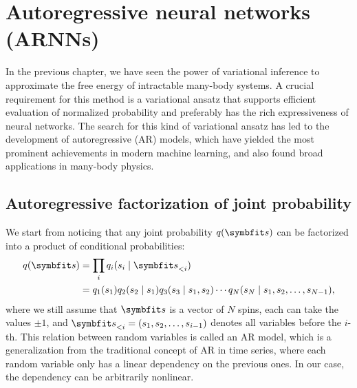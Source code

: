 \chapter{Autoregressive neural networks (ARNNs)}
\label{ch:arnn}

In the previous chapter, we have seen the power of variational inference to approximate the free energy of intractable many-body systems. A crucial requirement for this method is a variational ansatz that supports efficient evaluation of normalized probability and preferably has the rich expressiveness of neural networks. The search for this kind of variational ansatz has led to the development of autoregressive (AR) models, which have yielded the most prominent achievements in modern machine learning, and also found broad applications in many-body physics.

\section{Autoregressive factorization of joint probability}

We start from noticing that any joint probability $q(\vs)$ can be factorized into a product of conditional probabilities:
\begin{align}
q(\vs) &= \prod_i q_i(s_i \mid \vs_{< i}) \label{eq:autoreg} \\
&= q_1(s_1) q_2(s_2 \mid s_1) q_3(s_3 \mid s_1, s_2) \cdots q_N(s_N \mid s_1, s_2, \ldots, s_{N - 1}),
\end{align}
where we still assume that $\vs$ is a vector of $N$ spins, each can take the values $\pm 1$, and $\vs_{< i} = (s_1, s_2, \ldots, s_{i - 1})$ denotes all variables before the $i$-th. This relation between random variables is called an AR model, which is a generalization from the traditional concept of AR in time series, where each random variable only has a linear dependency on the previous ones. In our case, the dependency can be arbitrarily nonlinear.

